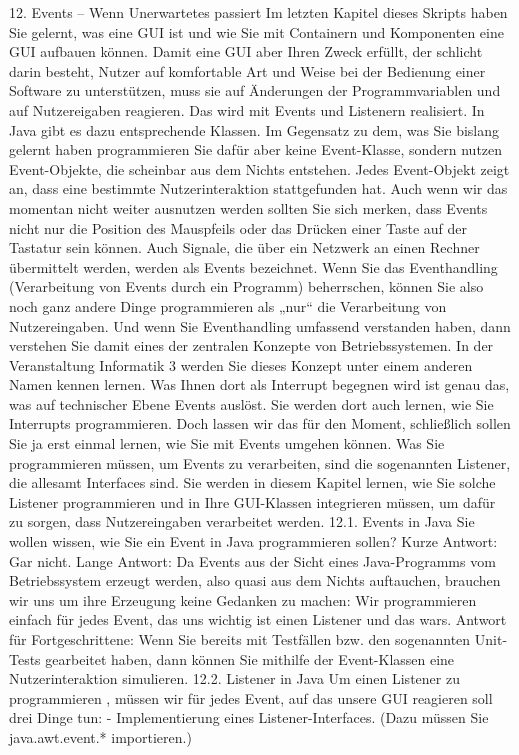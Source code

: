 12.	Events – Wenn Unerwartetes passiert
Im letzten Kapitel dieses Skripts haben Sie gelernt, was eine GUI ist und wie Sie mit Containern und Komponenten eine GUI aufbauen können. Damit eine GUI aber Ihren Zweck erfüllt, der schlicht darin besteht, Nutzer auf komfortable Art und Weise bei der Bedienung einer Software zu unterstützen, muss sie auf Änderungen der Programmvariablen und auf Nutzereigaben reagieren.
Das wird mit Events und Listenern realisiert. In Java gibt es dazu entsprechende Klassen. Im Gegensatz zu dem, was Sie bislang gelernt haben programmieren Sie dafür aber keine Event-Klasse, sondern nutzen Event-Objekte, die scheinbar aus dem Nichts entstehen. Jedes Event-Objekt zeigt an, dass eine bestimmte Nutzerinteraktion stattgefunden hat.
Auch wenn wir das momentan nicht weiter ausnutzen werden sollten Sie sich merken, dass Events nicht nur die Position des Mauspfeils oder das Drücken einer Taste auf der Tastatur sein können. Auch Signale, die über ein Netzwerk an einen Rechner übermittelt werden, werden als Events bezeichnet. Wenn Sie das Eventhandling (Verarbeitung von Events durch ein Programm) beherrschen, können Sie also noch ganz andere Dinge programmieren als „nur“ die Verarbeitung von Nutzereingaben. Und wenn Sie Eventhandling umfassend verstanden haben, dann verstehen Sie damit eines der zentralen Konzepte von Betriebssystemen. 
In der Veranstaltung Informatik 3 werden Sie dieses Konzept unter einem anderen Namen kennen lernen. Was Ihnen dort als Interrupt begegnen wird ist genau das, was auf technischer Ebene Events auslöst. Sie werden dort auch lernen, wie Sie Interrupts programmieren. Doch lassen wir das für den Moment, schließlich sollen Sie ja erst einmal lernen, wie Sie mit Events umgehen können.
Was Sie programmieren müssen, um Events zu verarbeiten, sind die sogenannten Listener, die allesamt Interfaces sind. Sie werden in diesem Kapitel lernen, wie Sie solche Listener programmieren und in Ihre GUI-Klassen integrieren müssen, um dafür zu sorgen, dass Nutzereingaben verarbeitet werden.
12.1.	Events in Java
Sie wollen wissen, wie Sie ein Event in Java programmieren sollen? 
Kurze Antwort: Gar nicht. 
Lange Antwort: Da Events aus der Sicht eines Java-Programms vom Betriebssystem erzeugt werden, also quasi aus dem Nichts auftauchen, brauchen wir uns um ihre Erzeugung keine Gedanken zu machen: Wir programmieren einfach für jedes Event, das uns wichtig ist einen Listener und das wars.
Antwort für Fortgeschrittene: Wenn Sie bereits mit Testfällen bzw. den sogenannten Unit-Tests gearbeitet haben, dann können Sie mithilfe der Event-Klassen eine Nutzerinteraktion simulieren.
12.2.	Listener in Java
Um einen Listener zu programmieren , müssen wir für jedes Event, auf das unsere GUI reagieren soll drei Dinge tun:
-	Implementierung eines Listener-Interfaces. (Dazu müssen Sie java.awt.event.* importieren.)

